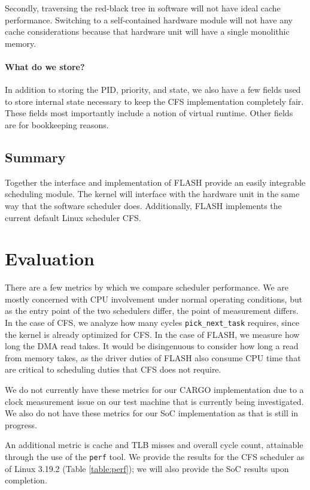 \documentclass{sig-alternate-10pt}
\begin{document}
Secondly, traversing the red-black tree in software will not have ideal cache
performance. Switching to a self-contained hardware module will not have any
cache considerations because that hardware unit will have a single
monolithic memory.

\paragraph{What do we store?}
In addition to storing the PID, priority, and state, we also have a few
fields used to store internal state necessary to keep the CFS implementation
completely fair.  These fields most importantly include a notion of virtual
runtime.  Other fields are for bookkeeping reasons.

\subsection{Summary}
Together the interface and implementation of FLASH provide an easily
integrable scheduling module.  The kernel will interface with the hardware
unit in the same way that the software scheduler does.  Additionally, FLASH
implements the current default Linux scheduler CFS.

\section{Evaluation}

There are a few metrics by which we compare scheduler performance. We are mostly concerned with CPU involvement under normal operating conditions, but as the entry point of the two schedulers differ, the point of measurement differs. In the case of CFS, we analyze how many cycles \verb|pick_next_task| requires, since the kernel is already optimized for CFS. In the case of FLASH, we measure how long the DMA read takes. It would be disingenuous to consider how long a read from memory takes, as the driver duties of FLASH also consume CPU time that are critical to scheduling duties that CFS does not require.

We do not currently have these metrics for our CARGO implementation due to a clock measurement issue on our test machine that is currently being investigated. We also do not have these metrics for our SoC implementation as that is still in progress.

An additional metric is cache and TLB misses and overall cycle count, attainable through the use of the \verb|perf| tool. We provide the results for the CFS scheduler as of Linux 3.19.2 (Table \ref{table:perf}); we will also provide the SoC results upon completion.
\end{document}
